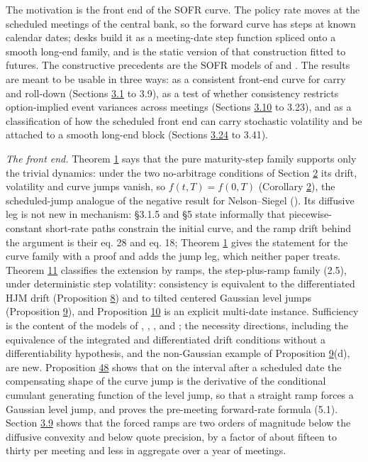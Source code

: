 \documentclass[11pt]{article}
\begin{document}
The motivation is the front end of the SOFR curve. The policy rate moves at the scheduled meetings of the central bank, so the forward curve has steps at known calendar dates; desks build it as a meeting-date step function spliced onto a smooth long-end family, and \cite{heitfield2019inferring} is the static version of that construction fitted to futures. The constructive precedents are the SOFR models of \cite{gellert2021short} and \cite{brace2024sofr}. The results are meant to be usable in three ways: as a consistent front-end curve for carry and roll-down (Sections \hyperref[sec:3.1]{3.1} to 3.9), as a test of whether consistency restricts option-implied event variances across meetings (Sections \hyperref[sec:3.10]{3.10} to 3.23), and as a classification of how the scheduled front end can carry stochastic volatility and be attached to a smooth long-end block (Sections \hyperref[sec:3.24]{3.24} to 3.41).

\emph{The front end.} Theorem \hyperref[res:Theorem-1]{1} says that the pure maturity-step family supports only the trivial dynamics: under the two no-arbitrage conditions of Section \hyperref[sec:2]{2} its drift, volatility and curve jumps vanish, so \(f(t,T)=f(0,T)\) (Corollary \hyperref[res:Corollary-2]{2}), the scheduled-jump analogue of the negative result for Nelson--Siegel (\cite{filipovic1999note}). Its diffusive leg is not new in mechanism: \cite{gellert2021short} §3.1.5 and §5 state informally that piecewise-constant short-rate paths constrain the initial curve, and the ramp drift behind the argument is their eq. 28 and \cite{brace2024sofr} eq. 18; Theorem \hyperref[res:Theorem-1]{1} gives the statement for the curve family with a proof and adds the jump leg, which neither paper treats. Theorem \hyperref[res:Theorem-11]{11} classifies the extension by ramps, the step-plus-ramp family (2.5), under deterministic step volatility: consistency is equivalent to the differentiated HJM drift (Proposition \hyperref[res:Proposition-8]{8}) and to tilted centered Gaussian level jumps (Proposition \hyperref[res:Proposition-9]{9}), and Proposition \hyperref[res:Proposition-10]{10} is an explicit multi-date instance. Sufficiency is the content of the models of \cite{gellert2021short}, \cite{brace2024sofr}, \cite{fontana2022term}, \cite{kellerressel2018affine} and \cite{kim2014jumps}; the necessity directions, including the equivalence of the integrated and differentiated drift conditions without a differentiability hypothesis, and the non-Gaussian example of Proposition \hyperref[res:Proposition-9]{9}(d), are new. Proposition \hyperref[res:Proposition-48]{48} shows that on the interval after a scheduled date the compensating shape of the curve jump is the derivative of the conditional cumulant generating function of the level jump, so that a straight ramp forces a Gaussian level jump, and proves the pre-meeting forward-rate formula (5.1). Section \hyperref[sec:3.9]{3.9} shows that the forced ramps are two orders of magnitude below the diffusive convexity and below quote precision, by a factor of about fifteen to thirty per meeting and less in aggregate over a year of meetings.
\end{document}
